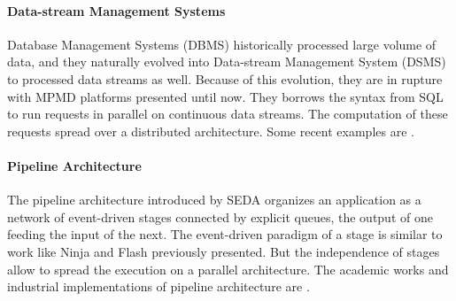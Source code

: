 
\paragraph{Data-stream Management Systems}

Database Management Systems (DBMS) historically processed large volume of data, and they naturally evolved into Data-stream Management System (DSMS) to processed data streams as well.
Because of this evolution, they are in rupture with MPMD platforms presented until now.
They borrows the syntax from SQL to run requests in parallel on continuous data streams.
The computation of these requests spread over a distributed architecture.
Some recent examples are .


\paragraph{Pipeline Architecture}

The pipeline architecture introduced by SEDA \cite{Welsh2001} organizes an application as a network of event-driven stages connected by explicit queues, the output of one feeding the input of the next.
The event-driven paradigm of a stage is similar to work like Ninja \cite{Gribble2001} and Flash \cite{Pai1999} previously presented.
But the independence of stages allow to spread the execution on a parallel architecture.
The academic works and industrial implementations of pipeline architecture are .


\paragraph{}

